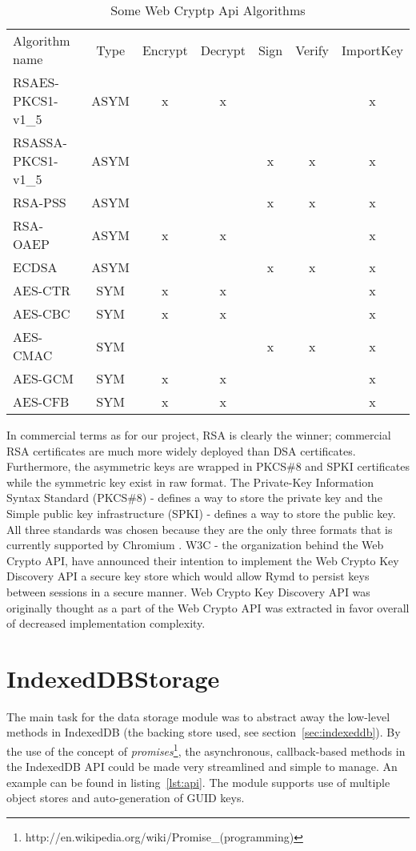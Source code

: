 \begin{table}[h]
\centering
\begin{tabular}{lcccccc}
Algorithm name & Type & Encrypt & Decrypt & Sign & Verify & ImportKey \\
RSAES-PKCS1-v1\_5 & ASYM & x & x &  &  & x \\
RSASSA-PKCS1-v1\_5 & ASYM &  &  & x & x & x \\
RSA-PSS & ASYM &  &  & x & x & x \\
RSA-OAEP & ASYM & x & x &  &  & x \\
ECDSA & ASYM &  &  & x & x & x \\
AES-CTR & SYM & x & x &  &  & x \\
AES-CBC & SYM & x & x &  &  & x \\
AES-CMAC & SYM &  &  & x & x & x \\
AES-GCM & SYM & x & x &  &  & x \\
AES-CFB & SYM & x & x &  &  & x
\end{tabular}
\caption{Some Web Cryptp Api Algorithms}
\label{table:webcrypoapi}
\end{table}
In commercial terms as for our project, RSA is clearly the winner; commercial RSA certificates are much more widely deployed than DSA certificates.
Furthermore, the asymmetric keys are wrapped in PKCS\#8 and SPKI certificates while the symmetric key exist in raw format.
The Private-Key Information Syntax Standard (PKCS\#8) -  defines a way to store the private key and the Simple public key infrastructure (SPKI) - defines a way to store the public key.
All three standards was chosen because they are the only three formats that is currently supported by Chromium \cite{ImplementedChromium:Online}.
W3C - the organization behind the Web Crypto API, have announced their intention to implement the Web Crypto Key Discovery API \cite{WebCryptoKeyDiscovery:Online} a secure key store which would allow Rymd to persist keys between sessions in a secure manner.
Web Crypto Key Discovery API was originally thought as a part of the Web Crypto API was extracted in favor overall of decreased implementation complexity.


\section{IndexedDBStorage}
\label{sec:datastorage}


The main task for the data storage module was to abstract away the low-level methods in IndexedDB (the backing store used, see section~\ref{sec:indexeddb}). By the use of the concept of \emph{promises}\footnote{http://en.wikipedia.org/wiki/Promise\_(programming)}, the asynchronous, callback-based methods in the IndexedDB API could be made very streamlined and simple to manage. An example can be found in listing~\ref{lst:api}. The module supports use of multiple object stores and auto-generation of GUID keys.

